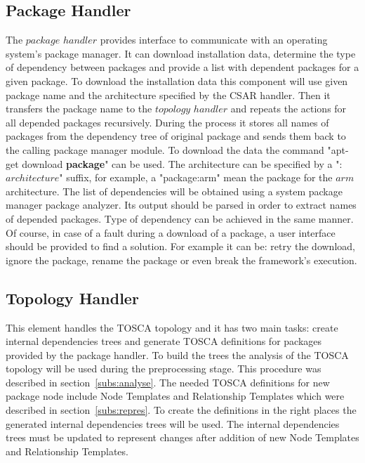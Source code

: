 \subsection{Package Handler} \label{subs:archph}
The $package$ $handler$ provides interface to communicate with an operating system's package manager. 
It can download installation data, determine the type of dependency between packages and provide a list with dependent packages for a given package.
To download the installation data this component will use given package name and the architecture specified by the CSAR handler.
Then it transfers the package name to the $topology$ $handler$ and repeats the actions for all depended packages recursively. 
During the process it stores all names of packages from the dependency tree of original package and sends them back to the calling package manager module.
To download the data the command "apt-get download \textbf{package}" can be used. 
The architecture can be specified by a ":$architecture$" suffix, for example, a "package:arm" mean the package for the $arm$ architecture.
The list of dependencies will be obtained using a system package manager package analyzer. %
Its output should be parsed in order to extract names of depended packages.
Type of dependency can be achieved in the same manner.
Of course, in case of a fault during a download of a package, a user interface should be provided to find a solution.
For example it can be: retry the download, ignore the package, rename the package or even break the framework's execution.

\subsection{Topology Handler} \label{subs:archtop}
This element handles the TOSCA topology and it has two main tasks: create internal dependencies trees and generate TOSCA definitions for packages provided by the package handler.
To build the trees the analysis of the TOSCA topology will be used during the preprocessing stage.
This procedure was described in section~\ref{subs:analyse}.
The needed TOSCA definitions for new package node include Node Templates and Relationship Templates which were described in section~\ref{subs:repres}.
To create the definitions in the right places the generated internal dependencies trees will be used.
The internal dependencies trees must be updated to represent changes after addition of new Node Templates and Relationship Templates.
